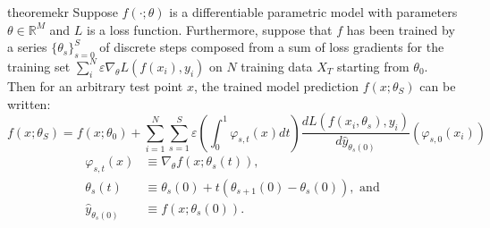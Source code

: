 \begin{restatable}{theorem}{ekr}
\label{thm:ekr}
Suppose $f(\cdot; \theta)$ is a differentiable parametric model with parameters $\theta \in \mathbb{R}^M$ and $L$ is a loss function. Furthermore, suppose that $f$ has been trained by a series $\{\theta_s\}_{s=0}^S$ of discrete steps composed from a sum of loss gradients for the training set $ \sum_{i}^N \varepsilon \nabla_\theta L(f(x_i), y_i)$ on $N$ training data $X_T$ starting from $\theta_0$. Then for an arbitrary test point $x$, the trained model prediction $f(x; \theta_S)$ can be written:
\begin{equation}
f(x; \theta_S) = f(x; \theta_0) + \sum_{i=1}^N \sum_{s=1}^S \varepsilon \left(\int_0^1 \varphi_{s,t}(x) dt\right) \dfrac{dL(f(x_i, \theta_s), y_i)}{d \hat y_{\theta_s(0)}} \left(\varphi_{s, 0}(x_i)\right)
\label{exact}
\end{equation}
\begin{align}
    \varphi_{s,t}(x) &\equiv \nabla_\theta f(x; \theta_s(t)), \\
    \theta_s(t) &\equiv \theta_s(0) + t(\theta_{s+1}(0)-\theta_s(0)), \text{ and}\\
    \hat y_{\theta_s(0)} &\equiv f(x; \theta_s(0)).
\end{align}
\end{restatable}
